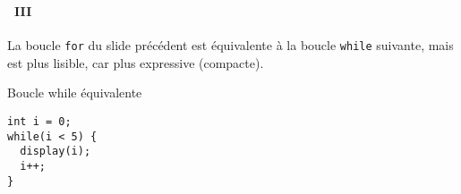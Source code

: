 \begin{frame}[containsverbatim]
  \frametitle{\secname}
  \framesubtitle{\subsecname~III}

  La boucle \verb|for| du slide précédent est équivalente à la boucle \verb|while| suivante, mais est plus lisible, car plus expressive (compacte).
  \vspace{0.5cm}
  \begin{exampleblock}{Boucle while équivalente}
    \begin{verbatim}
int i = 0;
while(i < 5) {
  display(i);
  i++;
}\end{verbatim}
  \end{exampleblock}
\end{frame}

